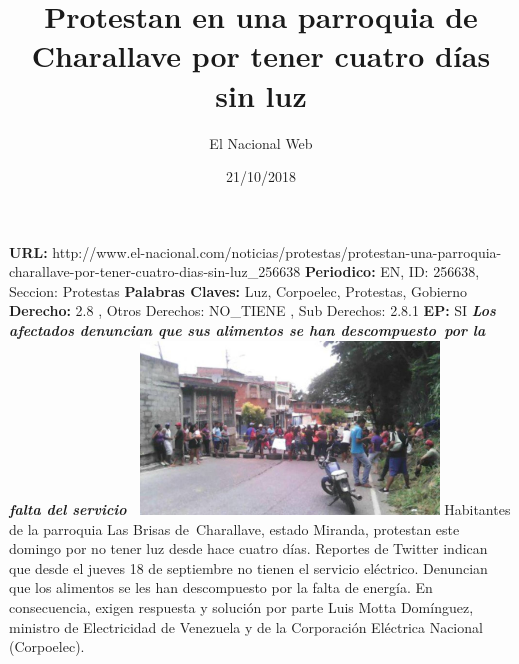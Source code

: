 \documentclass{article}%
\title{\textbf{Protestan en una parroquia de Charallave por tener cuatro días sin luz}}%
\author{El Nacional Web}%
\date{21/10/2018}%
\begin{document}
%
\normalsize%
\maketitle%
\textbf{URL: }%
http://www.el{-}nacional.com/noticias/protestas/protestan{-}una{-}parroquia{-}charallave{-}por{-}tener{-}cuatro{-}dias{-}sin{-}luz\_256638\newline%
%
\textbf{Periodico: }%
EN, %
ID: %
256638, %
Seccion: %
Protestas\newline%
%
\textbf{Palabras Claves: }%
Luz, Corpoelec, Protestas, Gobierno\newline%
%
\textbf{Derecho: }%
2.8%
, Otros Derechos: %
NO\_TIENE%
, Sub Derechos: %
2.8.1%
\newline%
%
\textbf{EP: }%
SI\newline%
\newline%
%
\textbf{\textit{Los afectados denuncian que sus alimentos se han descompuesto~por la falta del servicio~}}%
\newline%
\newline%
%
\includegraphics[width=300px]{68.jpg}%
\newline%
%
Habitantes de la parroquia Las Brisas de~Charallave, estado Miranda, protestan este domingo por no tener luz desde hace cuatro días.%
\newline%
%
Reportes de Twitter indican que desde el jueves 18 de septiembre no tienen el servicio eléctrico. Denuncian que los alimentos se les han descompuesto por la falta de energía.%
\newline%
%
En consecuencia, exigen respuesta y solución por parte Luis Motta Domínguez, ministro de Electricidad de Venezuela y de la Corporación Eléctrica Nacional (Corpoelec).%
\newline%
%
\end{document}
